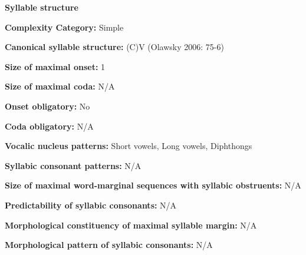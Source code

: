 \begin{styleBody}
\textbf{Syllable structure}
\end{styleBody}

\begin{styleBody}
\textbf{Complexity Category:} Simple
\end{styleBody}

\begin{styleBody}
\textbf{Canonical syllable structure:} (C)V (Olawsky 2006: 75-6)
\end{styleBody}

\begin{styleBody}
\textbf{Size of maximal onset: }1
\end{styleBody}

\begin{styleBody}
\textbf{Size of maximal coda:} N/A
\end{styleBody}

\begin{styleBody}
\textbf{Onset obligatory:} No
\end{styleBody}

\begin{styleBody}
\textbf{Coda obligatory:} N/A
\end{styleBody}

\begin{styleBody}
\textbf{Vocalic nucleus patterns:} Short vowels, Long vowels, Diphthongs
\end{styleBody}

\begin{styleBody}
\textbf{Syllabic consonant patterns:} N/A
\end{styleBody}

\begin{styleBody}
\textbf{Size of maximal word{}-marginal sequences with syllabic obstruents:} N/A
\end{styleBody}

\begin{styleBody}
\textbf{Predictability of syllabic consonants:} N/A
\end{styleBody}

\begin{styleBody}
\textbf{Morphological constituency of maximal syllable margin:} N/A
\end{styleBody}

\begin{styleBody}
\textbf{Morphological pattern of syllabic consonants:} N/A
\end{styleBody}

